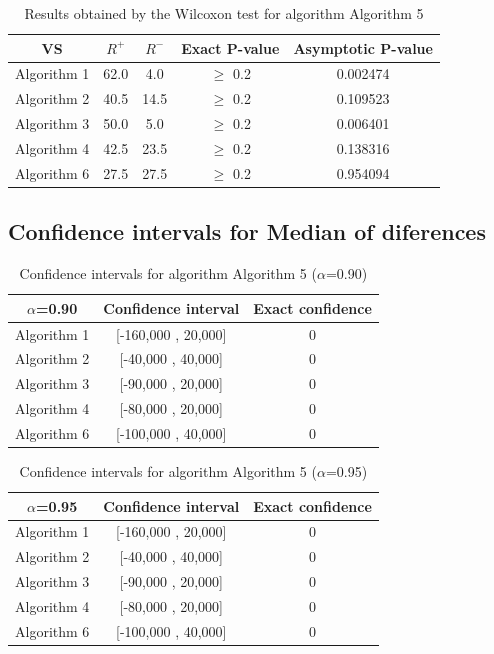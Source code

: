 \documentclass[a4paper,10pt]{article}
\begin{document}
\begin{table}[!htp]
\centering\small
\begin{tabular}{
|c|c|c|c|c|}
\hline
 VS & $R^{+}$ & $R^{-}$ & Exact P-value & Asymptotic P-value \\ \hline 
Algorithm 1 & 62.0 & 4.0 & $\geq$ 0.2 & 0.002474\\ \hline 
Algorithm 2 & 40.5 & 14.5 & $\geq$ 0.2 & 0.109523\\ \hline 
Algorithm 3 & 50.0 & 5.0 & $\geq$ 0.2 & 0.006401\\ \hline 
Algorithm 4 & 42.5 & 23.5 & $\geq$ 0.2 & 0.138316\\ \hline 
Algorithm 6 & 27.5 & 27.5 & $\geq$ 0.2 & 0.954094\\ \hline 

\end{tabular}
\caption{Results obtained by the Wilcoxon test for algorithm Algorithm 5}
\end{table}

\subsection{Confidence intervals for Median of diferences}

\begin{table}[!htp]
\centering\small
\begin{tabular}{
|c|c|c|}
\hline
 $\alpha$=0.90 & Confidence interval & Exact confidence \\ \hline 
Algorithm 1 & [-160,000 , 20,000] & 0\\ \hline 
Algorithm 2 & [-40,000 , 40,000] & 0\\ \hline 
Algorithm 3 & [-90,000 , 20,000] & 0\\ \hline 
Algorithm 4 & [-80,000 , 20,000] & 0\\ \hline 
Algorithm 6 & [-100,000 , 40,000] & 0\\ \hline 

\end{tabular}
\caption{Confidence intervals for algorithm Algorithm 5 ($\alpha$=0.90)}
\end{table}
\begin{table}[!htp]
\centering\small
\begin{tabular}{
|c|c|c|}
\hline
 $\alpha$=0.95 & Confidence interval & Exact confidence \\ \hline 
Algorithm 1 & [-160,000 , 20,000] & 0\\ \hline 
Algorithm 2 & [-40,000 , 40,000] & 0\\ \hline 
Algorithm 3 & [-90,000 , 20,000] & 0\\ \hline 
Algorithm 4 & [-80,000 , 20,000] & 0\\ \hline 
Algorithm 6 & [-100,000 , 40,000] & 0\\ \hline 

\end{tabular}
\caption{Confidence intervals for algorithm Algorithm 5 ($\alpha$=0.95)}
\end{table}
\end{document}
